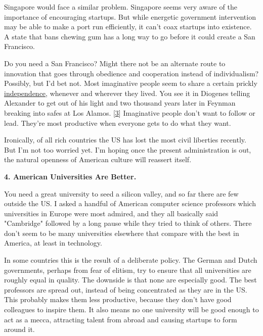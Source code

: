 Singapore would face a similar problem. Singapore
                  seems very aware of the importance of encouraging startups.
                  But while energetic government intervention may be able to
                  make a port run efficiently, it can't coax startups into
                  existence. A state that bans chewing gum has a long way to go
                  before it could create a San Francisco.

Do you need
                  a San Francisco? Might there not be an alternate route to
                  innovation that goes through obedience and cooperation instead
                  of individualism? Possibly, but I'd bet not. Most imaginative
                  people seem to share a certain prickly
                  \href{http://www.paulgraham.com/gba.html}{independence}, whenever and wherever
                  they lived. You see it in Diogenes telling Alexander to get
                  out of his light and two thousand years later in Feynman
                  breaking into safes at Los Alamos.
                  [\href{\#f3n}{3}]
                  Imaginative people don't want to follow or lead. They're most
                  productive when everyone gets to do what they want.

Ironically,
                  of all rich countries the US has lost the most civil liberties
                  recently. But I'm not too worried yet. I'm hoping once the
                  present administration is out, the natural openness of
                  American culture will reassert itself.

\textbf{4. American Universities Are Better.}

You need a great university to seed a silicon
                  valley, and so far there are few outside the US. I asked a
                  handful of American computer science professors which
                  universities in Europe were most admired, and they all
                  basically said "Cambridge" followed by a long pause while they
                  tried to think of others. There don't seem to be many
                  universities elsewhere that compare with the best in America,
                  at least in technology.

In some countries this is
                  the result of a deliberate policy. The German and Dutch
                  governments, perhaps from fear of elitism, try to ensure that
                  all universities are roughly equal in quality. The downside is
                  that none are especially good. The best professors are spread
                  out, instead of being concentrated as they are in the US. This
                  probably makes them less productive, because they don't have
                  good colleagues to inspire them. It also means no one
                  university will be good enough to act as a mecca, attracting
                  talent from abroad and causing startups to form around it.

